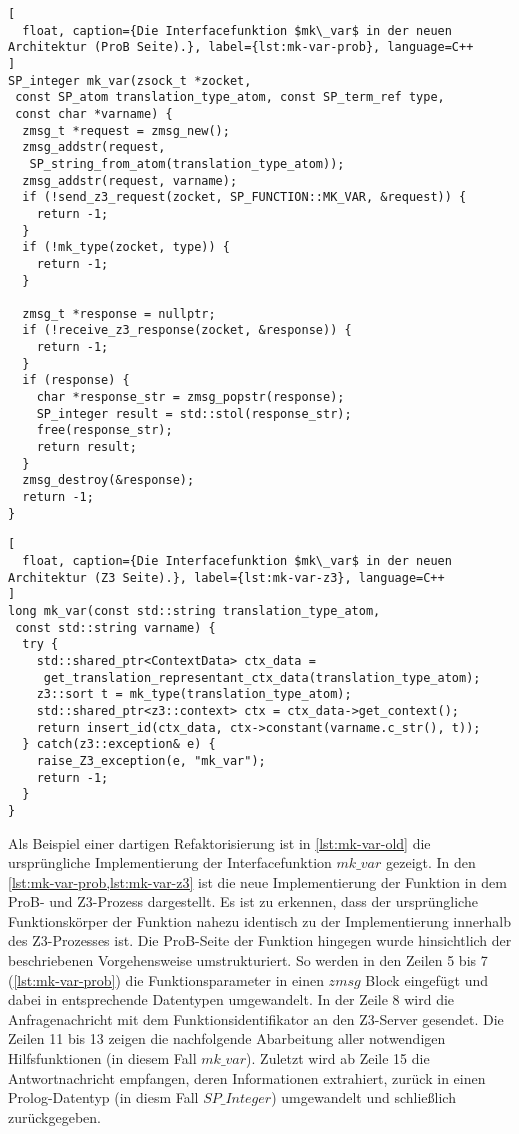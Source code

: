 \begin{lstlisting}[
  float, caption={Die Interfacefunktion $mk\_var$ in der neuen Architektur (ProB Seite).}, label={lst:mk-var-prob}, language=C++
]
SP_integer mk_var(zsock_t *zocket,
 const SP_atom translation_type_atom, const SP_term_ref type,
 const char *varname) {
  zmsg_t *request = zmsg_new();
  zmsg_addstr(request,
   SP_string_from_atom(translation_type_atom));
  zmsg_addstr(request, varname);
  if (!send_z3_request(zocket, SP_FUNCTION::MK_VAR, &request)) {
    return -1;
  }
  if (!mk_type(zocket, type)) {
    return -1;
  }

  zmsg_t *response = nullptr;
  if (!receive_z3_response(zocket, &response)) {
    return -1;
  }
  if (response) {
    char *response_str = zmsg_popstr(response);
    SP_integer result = std::stol(response_str);
    free(response_str);
    return result;
  }
  zmsg_destroy(&response);
  return -1;
}
\end{lstlisting}

\begin{lstlisting}[
  float, caption={Die Interfacefunktion $mk\_var$ in der neuen Architektur (Z3 Seite).}, label={lst:mk-var-z3}, language=C++
]
long mk_var(const std::string translation_type_atom,
 const std::string varname) {
  try {
    std::shared_ptr<ContextData> ctx_data = 
     get_translation_representant_ctx_data(translation_type_atom);
    z3::sort t = mk_type(translation_type_atom);
    std::shared_ptr<z3::context> ctx = ctx_data->get_context();
    return insert_id(ctx_data, ctx->constant(varname.c_str(), t));
  } catch(z3::exception& e) {
    raise_Z3_exception(e, "mk_var");
    return -1;
  }
}
\end{lstlisting}


Als Beispiel einer dartigen Refaktorisierung ist in \cref{lst:mk-var-old} die ursprüngliche Implementierung der Interfacefunktion $mk\_var$ gezeigt.
In den \cref{lst:mk-var-prob,lst:mk-var-z3} ist die neue Implementierung der Funktion in dem ProB- und Z3-Prozess dargestellt.
Es ist zu erkennen, dass der ursprüngliche Funktionskörper der Funktion nahezu identisch zu der Implementierung innerhalb des Z3-Prozesses ist.
Die ProB-Seite der Funktion hingegen wurde hinsichtlich der beschriebenen Vorgehensweise umstrukturiert.
So werden in den Zeilen 5 bis 7 (\cref{lst:mk-var-prob}) die Funktionsparameter in einen $zmsg$ Block eingefügt und dabei in entsprechende Datentypen umgewandelt.
In der Zeile 8 wird die Anfragenachricht mit dem Funktionsidentifikator an den Z3-Server gesendet.
Die Zeilen 11 bis 13 zeigen die nachfolgende Abarbeitung aller notwendigen Hilfsfunktionen (in diesem Fall $mk\_var$).
Zuletzt wird ab Zeile 15 die Antwortnachricht empfangen, deren Informationen extrahiert, zurück in einen Prolog-Datentyp (in diesm Fall $SP\_Integer$) umgewandelt und schließlich zurückgegeben.


